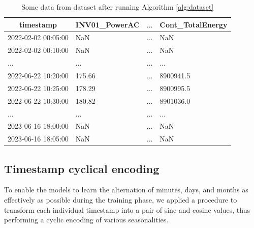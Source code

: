 \begin{table}[H]
	\begin{center}
		\begin{tabular}[c]{l|l|l|l}
			\hline
			\multicolumn{1}{c|}{\textbf{timestamp}}      &
			\multicolumn{1}{c|}{\textbf{INV01\_PowerAC}} &
			\multicolumn{1}{c|}{\textbf{$\ldots$}}       &
			\multicolumn{1}{c}{\textbf{Cont\_TotalEnergy}}                                 \\
			\hline
			2022-02-02 00:05:00                          & NaN      & $\ldots$ & NaN       \\
			2022-02-02 00:10:00                          & NaN      & $\ldots$ & NaN       \\
			$\ldots$                                     & $\ldots$ & $\ldots$ & $\ldots$  \\
			2022-06-22 10:20:00                          & 175.66   & $\ldots$ & 8900941.5 \\
			2022-06-22 10:25:00                          & 178.29   & $\ldots$ & 8900995.5 \\
			2022-06-22 10:30:00                          & 180.82   & $\ldots$ & 8901036.0 \\
			$\ldots$                                     & $\ldots$ & $\ldots$ & $\ldots$  \\
			2023-06-16 18:00:00                          & NaN      & $\ldots$ & NaN       \\
			2023-06-16 18:05:00                          & NaN      & $\ldots$ & NaN       \\
		\end{tabular}
	\end{center}
	\caption{Some data from dataset after running Algorithm \ref{alg:dataset}}\label{tab:datasetfinalvalues}
\end{table}

\subsection{Timestamp cyclical encoding}
To enable the models to learn the alternation of minutes, days,
and months as effectively as possible during the training phase,
we applied a procedure to transform each individual timestamp into
a pair of sine and cosine values, thus performing a cyclic
encoding of various seasonalities.



